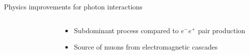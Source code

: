 \documentclass[t]{beamer}
\begin{document}
\begin{columns}[onlytextwidth]
\begin{column}{\textwidth}
\begin{block}{Physics improvements for photon interactions}
\begin{minipage}[t]{0.3\textwidth}
\begin{minipage}[t][10cm]{\textwidth}
\begin{columns}[onlytextwidth]
\begin{column}{0.35\textwidth}
\begin{figure}
\begin{tikzpicture}[>=stealth', pos=.55, photon/.style={decorate,decoration={snake,post length=2mm}}]
                    \end{tikzpicture}
                    \end{figure}
                \end{column}            
                \begin{column}{0.6\textwidth}%
                  \begin{itemize}[leftmargin=0.5cm]
                    \item Subdominant process compared to $e^- e^+$ pair production
                    \item Source of muons from electromagnetic cascades

                  \end{itemize}
                \end{column}
            \end{columns}
          \end{minipage}
        \end{minipage}

      \end{block}
    \end{column}
    \end{columns}
\end{document}
